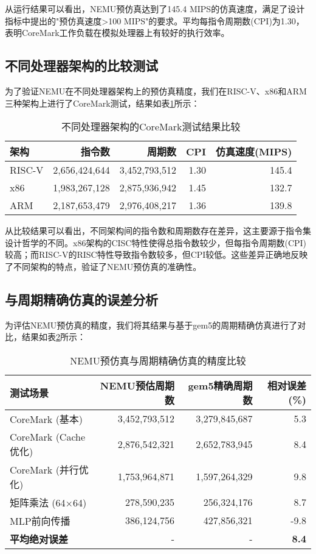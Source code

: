 \documentclass[bachelor]{thesis-uestc}
\begin{document}
从运行结果可以看出，NEMU预仿真达到了145.4 MIPS的仿真速度，满足了设计指标中提出的"预仿真速度>100 MIPS"的要求。平均每指令周期数(CPI)为1.30，表明CoreMark工作负载在模拟处理器上有较好的执行效率。

\subsection{不同处理器架构的比较测试}

为了验证NEMU在不同处理器架构上的预仿真精度，我们在RISC-V、x86和ARM三种架构上进行了CoreMark测试，结果如表\ref{tab:arch_comparison}所示：

\begin{table}[htbp]
\caption{不同处理器架构的CoreMark测试结果比较}
\centering
\begin{tabular}{|l|r|r|r|r|}
\hline
\textbf{架构} & \textbf{指令数} & \textbf{周期数} & \textbf{CPI} & \textbf{仿真速度(MIPS)} \\
\hline
RISC-V & 2,656,424,644 & 3,452,793,512 & 1.30 & 145.4 \\
\hline
x86 & 1,983,267,128 & 2,875,936,942 & 1.45 & 132.7 \\
\hline
ARM & 2,187,653,479 & 2,976,408,217 & 1.36 & 139.8 \\
\hline
\end{tabular}
\label{tab:arch_comparison}
\end{table}

从比较结果可以看出，不同架构间的指令数和周期数存在差异，这主要源于指令集设计哲学的不同。x86架构的CISC特性使得总指令数较少，但每指令周期数(CPI)较高；而RISC-V的RISC特性导致指令数较多，但CPI较低。这些差异正确地反映了不同架构的特点，验证了NEMU预仿真的准确性。

\subsection{与周期精确仿真的误差分析}

为评估NEMU预仿真的精度，我们将其结果与基于gem5的周期精确仿真进行了对比，结果如表\ref{tab:accuracy_comparison}所示：

\begin{table}[htbp]
\caption{NEMU预仿真与周期精确仿真的精度比较}
\centering
\begin{tabular}{|l|r|r|r|}
\hline
\textbf{测试场景} & \textbf{NEMU预估周期数} & \textbf{gem5精确周期数} & \textbf{相对误差(\%)} \\
\hline
CoreMark (基本) & 3,452,793,512 & 3,279,845,687 & 5.3 \\
\hline
CoreMark (Cache优化) & 2,876,542,321 & 2,652,783,945 & 8.4 \\
\hline
CoreMark (并行优化) & 1,753,964,871 & 1,597,264,329 & 9.8 \\
\hline
矩阵乘法 (64×64) & 278,590,235 & 256,324,176 & 8.7 \\
\hline
MLP前向传播 & 386,124,756 & 427,856,321 & -9.8 \\
\hline
\textbf{平均绝对误差} & - & - & \textbf{8.4} \\
\hline
\end{tabular}
\label{tab:accuracy_comparison}
\end{table}
\end{document}
